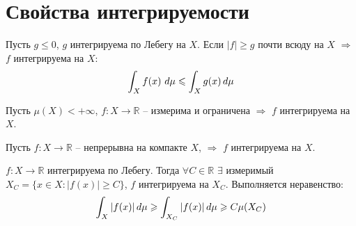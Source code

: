 \section*{Свойства интегрируемости}

\begin{to_thr}
	Пусть $g \leq 0$, $g$ интегрируема по Лебегу на $X$. Если $|f| \geq g$ почти всюду на $X$ $\Rightarrow$ $f$ интегрируема на $X$:
	$$\int_X f(x) \, \, d \mu \leqslant \int_X g(x) \, d \mu$$
\end{to_thr}


\begin{to_thr}
	Пусть $\mu (X) < + \infty$, $f:X \rightarrow \mathbb{R}$ -- измерима и ограничена $\Rightarrow$ $f$ интегрируема на $X$.
\end{to_thr}

\begin{to_thr}
	Пусть $f:X \rightarrow \mathbb{R}$ -- непрерывна на компакте $X$, $\Rightarrow$ $f$ интегрируема на $X$.
\end{to_thr}

\begin{to_thr}
	$f \colon X \rightarrow \mathbb{R}$ интегрируема по Лебегу. Тогда $\forall C \in \mathbb{R}$ $\exists$ измеримый $X_C = \{ x \in X \colon |f(x)|\geq C \}$, $f$ интегрируема на $X_C$. Выполняется неравенство:
	$$ \int_X |f(x)| \, d \mu \geqslant \int_{X_C} |f(x)| \, d \mu \geqslant C \mu(X_C) $$
\end{to_thr}
